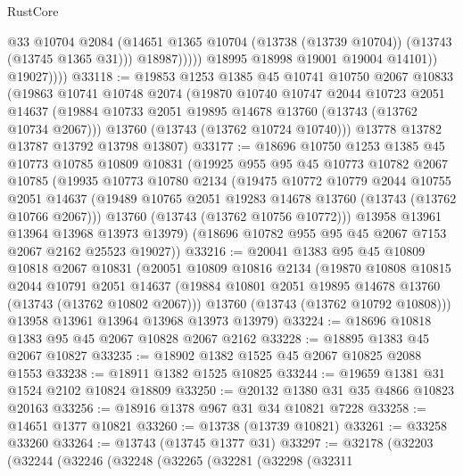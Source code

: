 \begin{lexlean}{RustCore}
\begin{coremodule}
                          @33
                          @10704
                          @2084
                          (@14651 @1365 @10704 (@13738 (@13739 @10704)) (@13743 (@13745 @1365 @31)))
                          @18987)))))
                @18995
                @18998
                @19001
                @19004
                @14101))
            @19027))))
@33118 := @19853
    @1253
    @1385
    @45
    @10741
    @10750
    @2067
    @10833
    (@19863
      @10741
      @10748
      @2074
      (@19870
        @10740
        @10747
        @2044
        @10723
        @2051
        @14637
        (@19884 @10733 @2051 @19895 @14678 @13760 (@13743 (@13762 @10734 @2067)))
        @13760
        (@13743 (@13762 @10724 @10740)))
      @13778
      @13782
      @13787
      @13792
      @13798
      @13807)
@33177 := @18696
    @10750
    @1253
    @1385
    @45
    @10773
    @10785
    @10809
    @10831
    (@19925
      @955
      @95
      @45
      @10773
      @10782
      @2067
      @10785
      (@19935
        @10773
        @10780
        @2134
        (@19475
          @10772
          @10779
          @2044
          @10755
          @2051
          @14637
          (@19489 @10765 @2051 @19283 @14678 @13760 (@13743 (@13762 @10766 @2067)))
          @13760
          (@13743 (@13762 @10756 @10772)))
        @13958
        @13961
        @13964
        @13968
        @13973
        @13979)
      (@18696 @10782 @955 @95 @45 @2067 @7153 @2067 @2162 @25523 @19027))
@33216 := @20041
    @1383
    @95
    @45
    @10809
    @10818
    @2067
    @10831
    (@20051
      @10809
      @10816
      @2134
      (@19870
        @10808
        @10815
        @2044
        @10791
        @2051
        @14637
        (@19884 @10801 @2051 @19895 @14678 @13760 (@13743 (@13762 @10802 @2067)))
        @13760
        (@13743 (@13762 @10792 @10808)))
      @13958
      @13961
      @13964
      @13968
      @13973
      @13979)
@33224 := @18696 @10818 @1383 @95 @45 @2067 @10828 @2067 @2162
@33228 := @18895 @1383 @45 @2067 @10827
@33235 := @18902 @1382 @1525 @45 @2067 @10825 @2088 @1553
@33238 := @18911 @1382 @1525 @10825
@33244 := @19659 @1381 @31 @1524 @2102 @10824 @18809
@33250 := @20132 @1380 @31 @35 @4866 @10823 @20163
@33256 := @18916 @1378 @967 @31 @34 @10821 @7228
@33258 := @14651 @1377 @10821
@33260 := @13738 (@13739 @10821)
@33261 := @33258 @33260
@33264 := @13743 (@13745 @1377 @31)
@33297 := @32178
    (@32203
      (@32244
        (@32246
          (@32248
            (@32265
              (@32281
                (@32298
                  (@32311

\end{coremodule}
\end{lexlean}
